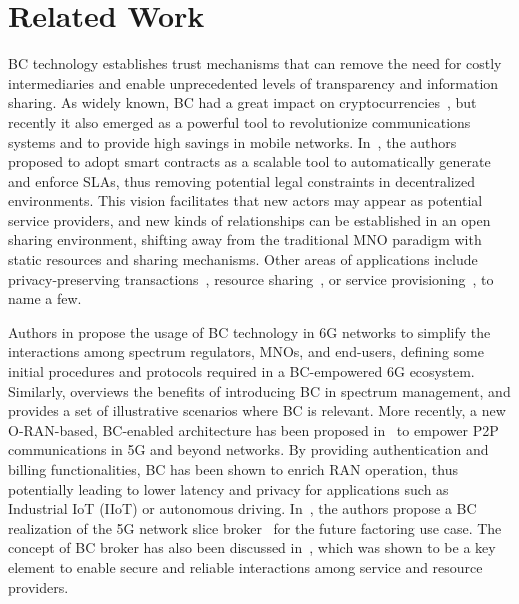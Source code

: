 \documentclass[conference]{IEEEtran}
\theoremstyle{definition}
\begin{document}

\section{Related Work}
\label{section:related_work}

BC technology establishes trust mechanisms that can remove the need for costly intermediaries and enable unprecedented levels of transparency and information sharing. As widely known, BC had a great impact on cryptocurrencies~\cite{nakamoto2019bitcoin}, but recently it also emerged as a powerful tool to revolutionize communications systems and to provide high savings in mobile networks. In~\cite{di2017smart}, the authors proposed to adopt smart contracts as a scalable tool to automatically generate and enforce SLAs, thus removing potential legal constraints in decentralized environments. This vision facilitates that new actors may appear as potential service providers, and new kinds of relationships can be established in an open sharing environment, shifting away from the traditional MNO paradigm with static resources and sharing mechanisms. Other areas of applications include privacy-preserving transactions~\cite{xu2021ran}, resource sharing~\cite{maksymyuk2020blockchain, xu2020blockchain}, or service provisioning~\cite{ling2019blockchain}, to name a few. 

Authors in \cite{maksymyuk2020blockchain} propose the usage of BC technology in 6G networks to simplify the interactions among spectrum regulators, MNOs, and end-users, defining some initial procedures and protocols required in a BC-empowered 6G ecosystem. 
Similarly, \cite{xu2020blockchain} overviews the benefits of introducing BC in spectrum management, and provides a set of illustrative scenarios where BC is relevant. More recently, a new {O-RAN}-based, BC-enabled architecture has been proposed in~\cite{xu2021ran} to empower P2P communications in 5G and beyond networks. By providing authentication and billing functionalities, BC has been shown to enrich RAN operation, thus potentially leading to lower latency and  privacy for applications such as Industrial IoT (IIoT) or autonomous driving. In~\cite{backman2017blockchain}, the authors propose a BC realization of the 5G network slice broker~\cite{samdanis2016network} for the future factoring use case. The concept of BC broker has also been discussed in~\cite{nour2019blockchain}, which was shown to be a key element to enable secure and reliable interactions among service and resource providers.
\end{document}
